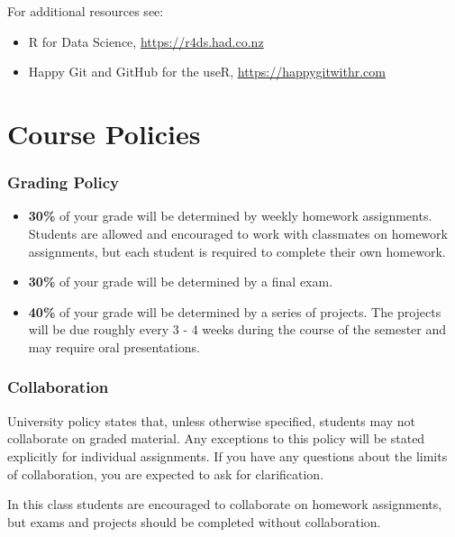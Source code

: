 \documentclass[11pt,]{article}
\providecommand{\tightlist}{%
  \setlength{\itemsep}{0pt}\setlength{\parskip}{0pt}}
\begin{document}
For additional resources see:

\begin{itemize}
\tightlist
\item
  R for Data Science, \url{https://r4ds.had.co.nz}
\item
  Happy Git and GitHub for the useR, \url{https://happygitwithr.com}
\end{itemize}

\hypertarget{course-policies}{%
\section{Course Policies}\label{course-policies}}

\hypertarget{grading-policy}{%
\subsubsection{Grading Policy}\label{grading-policy}}

\begin{itemize}
\item
  \textbf{30\%} of your grade will be determined by weekly homework
  assignments. Students are allowed and encouraged to work with
  classmates on homework assignments, but each student is required to
  complete their own homework.
\item
  \textbf{30\%} of your grade will be determined by a final exam.
\item
  \textbf{40\%} of your grade will be determined by a series of
  projects. The projects will be due roughly every 3 - 4 weeks during
  the course of the semester and may require oral presentations.
\end{itemize}

\hypertarget{collaboration}{%
\subsubsection{Collaboration}\label{collaboration}}

University policy states that, unless otherwise specified, students may
not collaborate on graded material. Any exceptions to this policy will
be stated explicitly for individual assignments. If you have any
questions about the limits of collaboration, you are expected to ask for
clarification.

In this class students are encouraged to collaborate on homework
assignments, but exams and projects should be completed without
collaboration.
\end{document}
